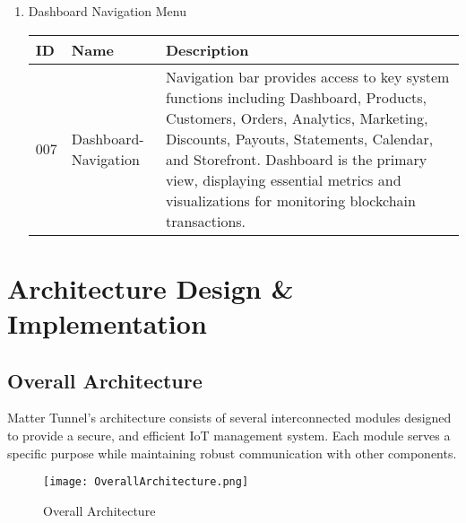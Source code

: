 \documentclass[conference]{IEEEtran}
\begin{document}
\begin{enumerate}[itemsep=2ex, parsep=1ex]
	\item Dashboard Navigation Menu
	      \begin{table}[h!]
	      	\def\arraystretch{1.24} \small
	      	\begin{tabular}{|p{1.2cm}|p{2.5cm}|p{4.0cm}|}
	      		\hline
	      		ID  & Name                 & Description                                                                                                                                                                                                                                                                                                     \\
	      		\hline
	      		007 & Dashboard-Navigation & Navigation bar provides access to key system functions including Dashboard, Products, Customers, Orders, Analytics, Marketing, Discounts, Payouts, Statements, Calendar, and Storefront. Dashboard is the primary view, displaying essential metrics and visualizations for monitoring blockchain transactions. \\
	      		\hline
	      	\end{tabular}
	      \end{table}
\end{enumerate}

\vspace{10cm}

\section{Architecture Design \& Implementation}
\subsection{Overall Architecture}

Matter Tunnel's architecture consists of several interconnected modules designed to provide a secure, and efficient IoT management system. Each module serves a specific purpose while maintaining robust communication with other components.

\begin{figure} [h!]
	\centering
	\texttt{[image: OverallArchitecture.png]}
	\caption{Overall Architecture}
	\label{fig:Overall Architecture}
\end{figure}
\end{document}
